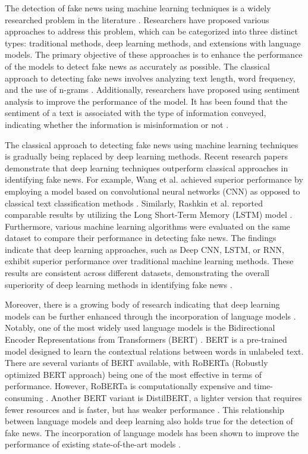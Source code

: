 The detection of fake news using machine learning techniques is a widely researched problem in the literature \autocite{Pathak2020}. Researchers have proposed various approaches to address this problem, which can be categorized into three distinct types: traditional methods, deep learning methods, and extensions with language models. The primary objective of these approaches is to enhance the performance of the models to detect fake news as accurately as possible. The classical approach to detecting fake news involves analyzing text length, word frequency, and the use of n-grams \autocite{Shu2017}. Additionally, researchers have proposed using sentiment analysis to improve the performance of the model. It has been found that the sentiment of a text is associated with the type of information conveyed, indicating whether the information is misinformation or not \autocite{rubin2016fake}.

The classical approach to detecting fake news using machine learning techniques is gradually being replaced by deep learning methods. Recent research papers demonstrate that deep learning techniques outperform classical approaches in identifying fake news. For example, Wang et al. achieved superior performance by employing a model based on convolutional neural networks (CNN) as opposed to classical text classification methods \autocite{wang-2017-liar}. Similarly, Rashkin et al. reported comparable results by utilizing the Long Short-Term Memory (LSTM) model \autocite{rashkin-etal-2017-truth}. Furthermore, various machine learning algorithms were evaluated on the same dataset to compare their performance in detecting fake news. The findings indicate that deep learning approaches, such as Deep CNN, LSTM, or RNN, exhibit superior performance over traditional machine learning methods. These results are consistent across different datasets, demonstrating the overall superiority of deep learning methods in identifying fake news \autocite{IEEE2021}. 

Moreover, there is a growing body of research indicating that deep learning models can be further enhanced through the incorporation of language models \autocite{Conroy2015}. Notably, one of the most widely used language models is the Bidirectional Encoder Representations from Transformers (BERT) \autocite{Devlin2018}. BERT is a pre-trained model designed to learn the contextual relations between words in unlabeled text. There are several variants of BERT available, with RoBERTa (Robustly optimized BERT approach) being one of the most effective in terms of performance. However, RoBERTa is computationally expensive and time-consuming \autocite{Liu2019}. Another BERT variant is DistilBERT, a lighter version that requires fewer resources and is faster, but has weaker performance \autocite{Sanh2019}. This relationship between language models and deep learning also holds true for the detection of fake news. The incorporation of language models has been shown to improve the performance of existing state-of-the-art models \autocite{Khan2021, Joy2022}.


